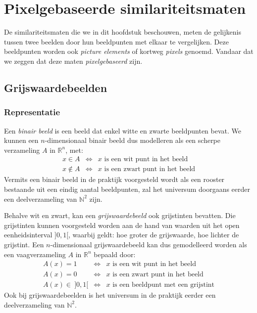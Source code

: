 \chapter{Pixelgebaseerde similariteitsmaten}

De similariteitsmaten die we in dit hoofdstuk beschouwen,
meten de gelijkenis tussen twee beelden door hun beeldpunten met elkaar te vergelijken.
Deze beeldpunten worden ook \emph{picture elements} of kortweg \emph{pixels} genoemd. Vandaar
dat we zeggen dat deze maten \emph{pixelgebaseerd} zijn.

\section{Grijswaardebeelden}

\subsection{Representatie}

Een \emph{binair beeld} is een beeld dat enkel witte en zwarte beeldpunten bevat. We kunnen een 
$n$-dimensionaal binair beeld dus modelleren als een scherpe verzameling $A$ in $\mathbb{R}^n$, met:
$$
\begin{array}{rcl}
x \in A & \iff & x \textrm{ is een wit punt in het beeld} \\
x \notin A & \iff & x \textrm{ is een zwart punt in het beeld}
\end{array}
$$ 
Vermits een binair beeld in de praktijk voorgesteld wordt als een rooster bestaande uit een
eindig aantal beeldpunten, zal het universum doorgaans eerder een deelverzameling van $\mathbb{N}^2$ zijn.

Behalve wit en zwart, kan een \emph{grijswaardebeeld} ook grijstinten bevatten. Die grijstinten
kunnen voorgesteld worden aan de hand van waarden uit het open eenheidsinterval $]0,1[$, waarbij
geldt: hoe groter de grijswaarde, hoe lichter de grijstint. Een $n$-dimensionaal grijswaardebeeld
kan dus gemodelleerd worden als een vaagverzameling $A$ in $\mathbb{R}^n$ bepaald door:
$$
\begin{array}{rcl}
A(x) = 1 & \iff & x \textrm{ is een wit punt in het beeld} \\
A(x) = 0 & \iff & x \textrm{ is een zwart punt in het beeld} \\
A(x) \in\ ]0,1[ & \iff & x \textrm{ is een beeldpunt met een grijstint}
\end{array}
$$
Ook bij grijswaardebeelden is het universum in de praktijk eerder een deelverzameling van $\mathbb{N}^2$.

